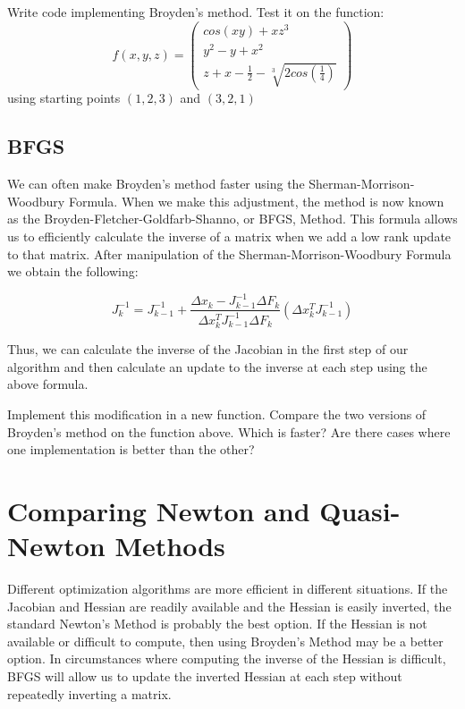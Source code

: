 \begin{problem}
Write code implementing Broyden's method. Test it on the function:
\[
f(x,y,z) = 
 \left( \begin{array}{ccc}
cos(xy)+ xz^3 \\
y^2 - y + x^2 \\
z + x-\frac{1}{2}-\sqrt[3]{2cos(\frac{1}{4})} \end{array} \right)
\]
using starting points $(1,2,3)$ and $(3,2,1)$
\end{problem}

\subsection*{BFGS}
We can often make Broyden's method faster using the Sherman-Morrison-Woodbury Formula.
When we make this adjustment, the method is now known as the Broyden-Fletcher-Goldfarb-Shanno, or BFGS, Method.
This formula allows us to efficiently calculate the inverse of a matrix when we add
a low rank update to that matrix. After manipulation of the Sherman-Morrison-Woodbury
Formula we obtain the following:

\[
J_k^{-1} = J_{k-1}^{-1} + \frac{\Delta x_k - J_{k-1}^{-1}\Delta F_k}{\Delta x_k^T J_{k-1}^{-1}\Delta F_k} (\Delta x_k^T J_{k-1}^{-1})
\]

Thus, we can calculate the inverse of the Jacobian in the first step of our algorithm
and then calculate an update to the inverse at each step using the above formula.

\begin{problem}
Implement this modification in a new function. Compare the two versions of Broyden's method on the function above.
Which is faster? Are there cases where one implementation is better than the other?
\end{problem}

\section*{Comparing Newton and Quasi-Newton Methods}

Different optimization algorithms are more efficient in different situations. If the
Jacobian and Hessian are readily available and the Hessian is easily inverted, the standard
Newton's Method is probably the best option. If the Hessian is not available or difficult to
compute, then using Broyden's Method may be a better option. In circumstances where computing
the inverse of the Hessian is difficult, BFGS will allow us to update the inverted Hessian
at each step without repeatedly inverting a matrix.

